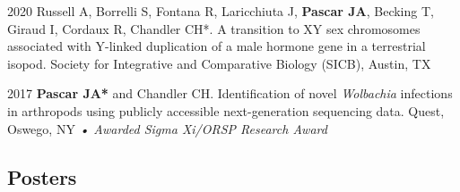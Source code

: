 \documentclass[12pt,letterpaper]{report}
\begin{document}
    \begin{tablist}

        \item[2020] \tab Russell A, Borrelli S, Fontana R, Laricchiuta J, \textbf{Pascar JA}, Becking T, Giraud I, Cordaux R, Chandler CH*. A transition to XY sex chromosomes associated with Y-linked duplication of a male hormone gene in a terrestrial isopod. Society for Integrative and Comparative Biology (SICB), Austin, TX
        
        
        \item[2017] \tab \textbf{Pascar JA*} and Chandler CH. Identification of novel {{\emph{Wolbachia}}} infections in arthropods using publicly accessible next-generation sequencing data. Quest, Oswego, NY \textit{• Awarded Sigma Xi/ORSP Research Award}

    \end{tablist}

    \subsection*{Posters}
\end{document}
